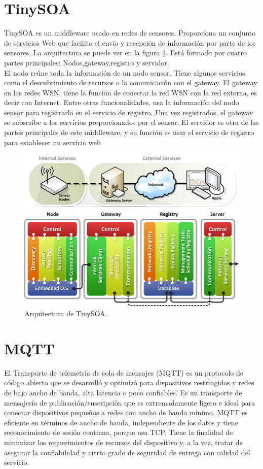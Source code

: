 \documentclass[12pt, twoside]{book}
\begin{document}
\section{TinySOA}
TinySOA es un middleware usado en redes de sensores. Proporciona un conjunto de servicios Web que facilita el envío y recepción de información por parte de los sensores. La arquitectura se puede ver en la figura \ref{tinysoa}. Está formado por cuatro partes principales: Nodos,gateway,registro y servidor. \\
El nodo reúne toda la información de un nodo sensor. Tiene algunos servicios como el descubrimiento de recursos o la comunicación con el gateway. El gateway en las redes WSN, tiene la función de conectar la red WSN con la red externa, es decir con Internet. Entre otras funcionalidades, usa la información del nodo sensor para registrarlo en el servicio de registro.  Una vez registrados, el gateway se subscribe a los servicios proporcionados por el sensor. El servidor es otra de las partes principales de este middleware, y su función es usar el servicio de registro para establecer un servicio web
\begin{figure}[H]
\centering
\includegraphics[scale=0.3]{images/tinysoa}
\caption{Arquitectura de TinySOA.}\label{tinysoa}
\end{figure}
\section{MQTT}
El Transporte de telemetría de cola de mensajes (MQTT) es un protocolo de código abierto que se desarrolló y optimizó para dispositivos restringidos y redes de bajo ancho de banda, alta latencia o poco confiables. Es un transporte de mensajería de publicación/suscripción que es extremadamente ligero e ideal para conectar dispositivos pequeños a redes con ancho de banda mínimo. MQTT es eficiente en términos de ancho de banda, independiente de los datos y tiene reconocimiento de sesión continua, porque usa TCP. Tiene la finalidad de minimizar los requerimientos de recursos del dispositivo y, a la vez, tratar de asegurar la confiabilidad y cierto grado de seguridad de entrega con calidad del servicio.
\end{document}

